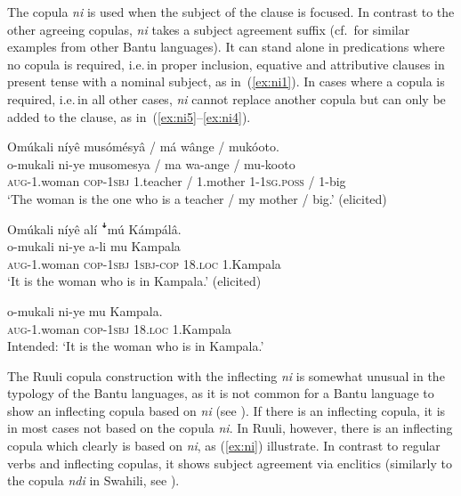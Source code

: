 \documentclass[output=paper,colorlinks,citecolor=brown,draftmode]{langscibook}
\begin{document}
The copula \textit{ni} is used when the subject of the clause is focused. 
In contrast to the other agreeing copulas, \textit{ni} takes a subject agreement suffix (cf.\,\citealt[219–202]{GibsonEtAl2019} for similar examples from other Bantu languages).
It can stand alone in predications where no copula is required, i.e.\,in proper inclusion, equative and attributive clauses in present tense with a nominal subject, as in~(\ref{ex:ni1}). 
In cases where a copula is required, i.e.\,in all other cases, \textit{ni} cannot replace another copula but can only be added to the clause, as in~(\ref{ex:ni5}--\ref{ex:ni4}).

\ea \label{ex:ni}
\begin{xlist}
	\ex \label{ex:ni1}
    	\glll   Omúkali níyê musómésyâ / má wânge / mukóoto.\\
    	        o-mukali ni-ye musomesya / ma wa-ange / mu-kooto\\
    	    	\textsc{aug}-1.woman \textsc{cop}-\textsc{1sbj} 1.teacher / 1.mother 1-1\textsc{sg.poss} / 1-big\\
        \glt ‘The woman is the one who is a teacher / my mother / big.’  (elicited)
    
    \ex \label{ex:ni5}
    	\glll Omúkali níyê alí ꜜmú Kámpálâ.\\
    	        o-mukali ni-ye a-li mu Kampala\\
    	    	\textsc{aug}-1.woman \textsc{cop}-1\textsc{sbj} 1\textsc{sbj}-\textsc{cop} 18.\textsc{loc} 1.Kampala\\
        \glt ‘It is the woman who is in Kampala.’ (elicited)
    
    \ex \label{ex:ni4}
    	\gll    *o-mukali ni-ye mu Kampala.\\
    	    	\textsc{aug}-1.woman \textsc{cop}-\textsc{1sbj} 18.\textsc{loc} 1.Kampala\\
        \glt Intended: ‘It is the woman who is in Kampala.’
\end{xlist}
\z

The Ruuli copula construction with the inflecting \textit{ni} is somewhat unusual in the typology of the Bantu languages, as it is not common for a Bantu language to show an inflecting copula based on \textit{ni} (see \citealt{GibsonEtAl2019}). 
If there is an inflecting copula, it is in most cases not based on the copula \textit{ni}. 
In Ruuli, however, there is an inflecting copula which clearly is based on \textit{ni}, as (\ref{ex:ni}) illustrate. 
In contrast to regular verbs and inflecting copulas, it shows subject agreement via enclitics (similarly to the copula \textit{ndi} in Swahili, see \citealt{GibsonEtAl2019}).
\end{document}
